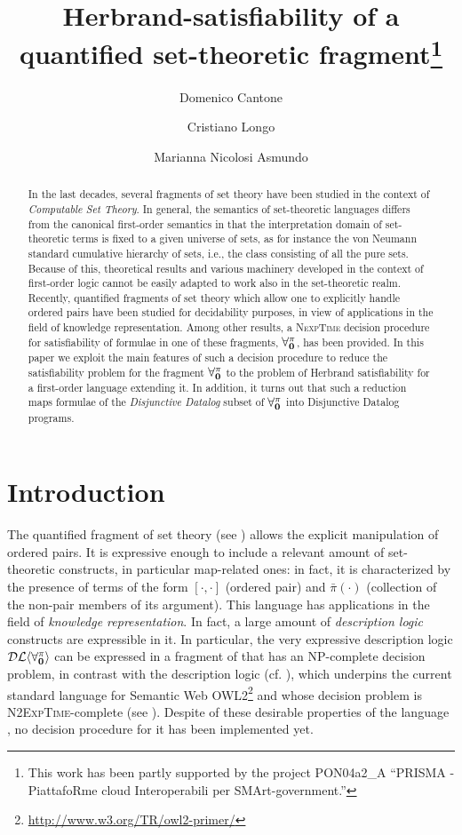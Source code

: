 \documentclass[a4paper]{llncs}
\title{Herbrand-satisfiability of a quantified set-theoretic 
fragment\thanks{This work has been partly supported by the project
PON04a2\_A ``PRISMA - Piat\-tafoRme cloud Interoperabili per 
SMArt-government.''}}
\author{Domenico Cantone \and Cristiano Longo \and Marianna Nicolosi Asmundo}
\institute{Dipartimento di Matematica e Informatica, Universit\`a di 
Catania, Italy\\
\email{\{cantone, longo, nicolosi\}@dmi.unict.it}}
\newcommand{\nonpairssym}{\bar{\pi}}
\newcommand{\nonpairs}[1]{\nonpairssym(#1)}
\begin{document}

\maketitle

\begin{abstract}
In the last decades, several fragments of set theory have been
studied  in the context of \emph{Computable
Set Theory}.
%
In general, the semantics of set-theoretic languages
differs from the canonical first-order semantics in that
the interpretation domain of set-theoretic terms is
fixed to a given universe of sets, as for instance
the von Neumann standard cumulative hierarchy of
sets, i.e., the class consisting of all the pure sets.
Because of this, theoretical results and various
machinery developed in the context of first-order logic
cannot be easily adapted to work also in the set-theoretic
realm.
%
Recently, quantified fragments of set theory
which allow one to explicitly handle ordered pairs have been
studied for decidability purposes, in view of applications in the 
field of knowledge
representation. Among other results, a \textsc{NexpTime}
decision procedure for satisfiability of formulae
in one of these fragments, $\mathbf{\forall_{0}^{\pi}}$, has been provided.
%
In this paper we exploit the main features of such a decision
procedure to reduce the satisfiability problem for the fragment
$\mathbf{\forall_{0}^{\pi}}$ to the problem of Herbrand satisfiability for a
first-order language extending it.  In addition, it turns out that
such a reduction maps formulae of the \emph{Disjunctive Datalog} subset
of $\mathbf{\forall_{0}^{\pi}}$ into Disjunctive Datalog programs.
\end{abstract}

\section{Introduction}\label{INTRO}

The quantified fragment of set theory \Forallpizero (see
\cite{CanLonNic2011}) allows the explicit manipulation of ordered
pairs.  It is expressive enough to include a relevant amount of
set-theoretic constructs, in particular map-related ones: in fact, it
is characterized by the presence of terms of the form $[\cdot,\cdot]$
(ordered pair) and $\nonpairs{\cdot}$ (collection of the non-pair
members of its argument).
%
This language has applications in the field of \emph{knowledge representation}.
In fact, a large amount of \emph{description logic} constructs
are expressible in it. In particular, the very expressive
description logic $\mathcal{DL\langle}\mathbf{\forall_{0}^{\pi}}\mathcal{\rangle}$ can be expressed
in a fragment of \Forallpizero that has an \textsc{NP}-complete
decision problem, in contrast with the description logic
\sroiq (cf. \cite{HorKutSat2006}),  which underpins the current 
standard  language for
Semantic Web OWL2\footnote{\url{http://www.w3.org/TR/owl2-primer/}} 
and whose decision problem is
\textsc{N2ExpTime}-complete (see \cite{Kaz2008}).
%
Despite of these desirable properties of the language \Forallpizero,
no decision procedure for it has been implemented yet.
\end{document}
